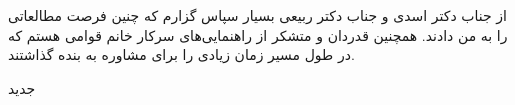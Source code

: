 

\begin{center}
\end{center}

از جناب دکتر اسدی و جناب دکتر ربیعی بسیار سپاس گزارم که چنین فرصت مطالعاتی را به من دادند.
همچنین قدردان و متشکر از راهنمایی‌های سرکار خانم قوامی هستم که در طول مسیر زمان زیادی را برای مشاوره به بنده گذاشتند.

‌جدید
